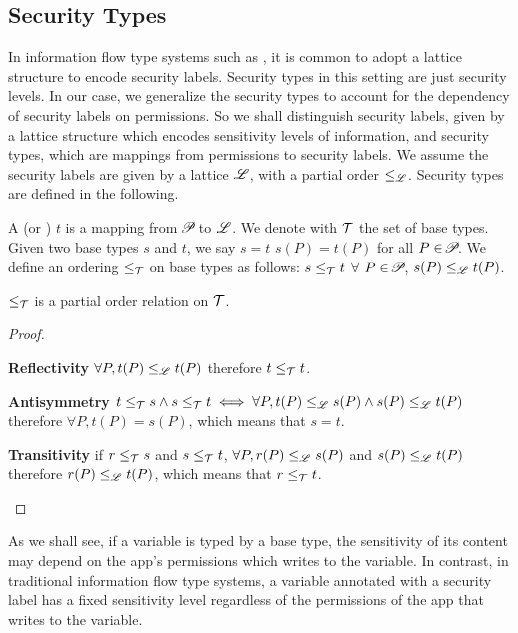 { \subsection{Security Types}\label{sec:types}

In information flow type systems such as \cite{Volpano:1996}, it is common to adopt a lattice
structure to encode security labels. Security types in this setting are just security
levels. In our case, we generalize the security types to account for
the dependency of security labels on permissions. So we shall distinguish
security labels, given by a lattice structure which encodes sensitivity levels
of information, and security types, which are mappings from permissions to security labels.
We assume the security labels are given by a lattice $\mathscr{L}$, with a partial order $\leq_{\mathscr{L}}$.
Security types are defined in the following.

\begin{definition}\label{def:base_type}
A  (or ) $t$ is a mapping from $\!\mathscr{P}\!$ to $\mathscr{L}$.
We denote with $\mathcal{T}$ the set of base types.
Given two base types $s$ and $t$, we say $s=t$  $s(P)=t(P)$ for all  $P\in\!\mathscr{P}\!$.
We define an ordering $\leq_{\mathcal{T}}$ on base types as follows: 
$s\leq_{\mathcal{T}} t$  $\forall$ $P\in \!\mathscr{P}\!$, $s(P) \leq_{\mathscr{L}} t(P)$.
\end{definition}

\begin{lemma}\label{lem:tleq_po}
	$\leq_{\mathcal{T}}$ is a partial order relation on $\mathcal{T}$.
\end{lemma}
\begin{proof}
\begin{ProofEnumDesc}[style=standard]
	\item[\textbf{Reflectivity}] $\forall P, t(P)\leq_{\mathscr{L}} t(P)$ therefore $t\leq_{\mathcal{T}} t$.
	\item[\textbf{Antisymmetry}] $t\leq_{\mathcal{T}} s\wedge s\leq_{\mathcal{T}} t\iff \forall P, t(P)\leq_{\mathscr{L}} s(P)
\wedge s(P) \leq_{\mathscr{L}} t(P)$ therefore $\forall P, t(P)=s(P)$, which means that $s=t$.
	\item[\textbf{Transitivity}] if $r\leq_{\mathcal{T}} s$ and $s\leq_{\mathcal{T}} t$, $\forall P, r(P) \leq_{\mathscr{L}} s(P)$ and $s(P)\leq_{\mathscr{L}} t(P)$ therefore $r(P) \leq_{\mathscr{L}} t(P)$, which means that $r \leq_{\mathcal{T}} t$.
\end{ProofEnumDesc}
\end{proof}
As we shall see, if a variable is typed by a base type, the sensitivity of
its content may depend on the app's permissions which writes to the variable.
In contrast, in traditional information flow type systems,
a variable annotated with a security label has a fixed sensitivity level
regardless of the permissions of the app that writes to the variable.

}
